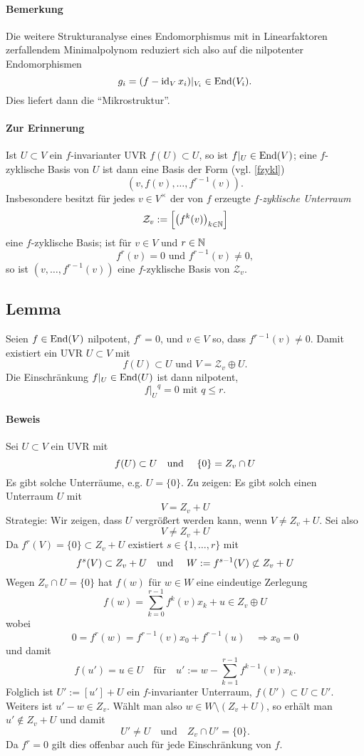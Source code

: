 \paragraph{Bemerkung}
	Die weitere Strukturanalyse eines Endomorphismus mit in Linearfaktoren zerfallendem Minimalpolynom reduziert sich also auf die nilpotenter Endomorphismen
		\[ g_i = (f-\operatorname{id}_Vx_i)|_{V_i}\in \operatorname{End}(V_i). \]
	Dies liefert dann die "`Mikrostruktur"'.
\paragraph{Zur Erinnerung}
	Ist $ U\subset V $ ein $ f $-invarianter UVR $ f(U)\subset U $, so ist $ f|_U\in \operatorname{End}(V) $; eine $ f $-zyklische Basis von $ U $ ist dann eine Basis der Form (vgl. \ref{fzykl})
		\[ \left(v,f(v),\dots,f^{r-1}(v)\right). \]
	Insbesondere besitzt für jedes $ v\in V^\times $ der von $ f $ erzeugte \emph{$ f $-zyklische Unterraum}
		\[ \mathcal{Z}_v := \left[\left(f^k(v)\right)_{k\in \mathbb{N}}\right] \]
	eine $ f $-zyklische Basis; ist für $ v\in V $ und $ r\in \mathbb{N} $
		\[ f^r(v) = 0 \text{ und }f^{r-1}(v)\neq 0, \]
	so ist $ (v,\dots,f^{r-1}(v)) $ eine $ f $-zyklische Basis von $ \mathcal{Z}_v $.
\subsection{Lemma}
	Seien $ f\in \operatorname{End}(V) $ nilpotent, $ f^r = 0 $, und $ v\in V $ so, dass $ f^{r-1}(v)\neq 0 $. Damit existiert ein UVR $ U\subset V $ mit
		\[ f(U)\subset U \text{ und } V = \mathcal{Z}_v \oplus U. \]
	Die Einschränkung $ f|_U \in \operatorname{End}(U) $ ist dann nilpotent,
		\[ {f|_U}^q = 0 \text{ mit } q\leq r. \]
\paragraph{Beweis}
	Sei $U\subset V$ ein UVR mit
		\[f(U)\subset U \text{\quad und \quad} \{0\}=Z_v\cap U\]
	Es gibt solche Unterräume, e.g. $U=\{0\}$. Zu zeigen: Es gibt solch einen Unterraum $U$ mit
		\[V=Z_v+U\]
	Strategie: Wir zeigen, dass $U$ vergrößert werden kann, wenn $V\neq Z_v+U$.
	Sei also 
		\[V\neq Z_v+U\]
	Da $f^r(V)=\{0\}\subset Z_v+U$ existiert $s\in\{1,\dots,r\}$ mit
		\[f^s(V)\subset Z_v+U \text{\quad und \quad} W:=f^{s-1}(V)\not\subset Z_v+U\]
	Wegen $Z_v\cap U  = \{0\}$ hat $f(w)$ für $w\in W$ eine eindeutige Zerlegung
		\[f(w)=\sum_{k=0}^{r-1}f^k(v)x_k+u \in Z_v \oplus U\]
	wobei
		\[0=f^r(w)=f^{r-1}(v)x_0+f^{r-1}(u) \quad\Rightarrow x_0=0\]
	und damit
		\[f(u')=u\in U \quad\text{für}\quad u':=w-\sum_{k=1}^{r-1} f^{k-1}(v)x_k. \]
	Folglich ist $U':=[u']+U$ ein $f$-invarianter Unterraum, $f(U')\subset U \subset U'$.
	Weiters ist $u'-w\in Z_v$.
	Wählt man also $w\in W\setminus(Z_v+U)$, so erhält man $u'\notin Z_v+U$ und damit
		\[U'\neq U \quad\text{und}\quad Z_v\cap U'=\{0\}.\]
	Da $f^r=0$ gilt dies offenbar auch für jede Einschränkung von $f$.

